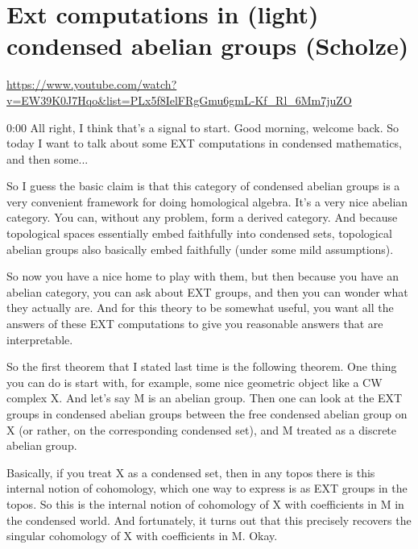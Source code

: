 
\section{\ufs Ext computations in (light) condensed abelian groups (Scholze)}

\url{https://www.youtube.com/watch?v=EW39K0J7Hqo&list=PLx5f8IelFRgGmu6gmL-Kf_Rl_6Mm7juZO}
\renewcommand{\yt}[2]{\href{https://www.youtube.com/watch?v=EW39K0J7Hqo&list=PLx5f8IelFRgGmu6gmL-Kf_Rl_6Mm7juZO&t=#1}{#2}}
\vspace{1em}

\begin{unfinished}{0:00}
  All right, I think that's a signal to start. Good morning, welcome back. So today I want to talk about some EXT computations in condensed mathematics, and then some...

So I guess the basic claim is that this category of condensed abelian groups is a very convenient framework for doing homological algebra. It's a very nice abelian category. You can, without any problem, form a derived category. And because topological spaces essentially embed faithfully into condensed sets, topological abelian groups also basically embed faithfully (under some mild assumptions).

So now you have a nice home to play with them, but then because you have an abelian category, you can ask about EXT groups, and then you can wonder what they actually are. And for this theory to be somewhat useful, you want all the answers of these EXT computations to give you reasonable answers that are interpretable.

So the first theorem that I stated last time is the following theorem. One thing you can do is start with, for example, some nice geometric object like a CW complex X. And let's say M is an abelian group. Then one can look at the EXT groups in condensed abelian groups between the free condensed abelian group on X (or rather, on the corresponding condensed set), and M treated as a discrete abelian group.

Basically, if you treat X as a condensed set, then in any topos there is this internal notion of cohomology, which one way to express is as EXT groups in the topos. So this is the internal notion of cohomology of X with coefficients in M in the condensed world. And fortunately, it turns out that this precisely recovers the singular cohomology of X with coefficients in M. Okay.


\end{unfinished}
